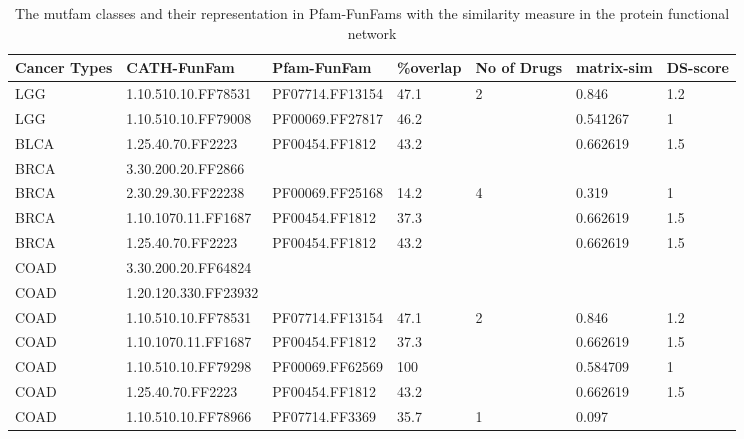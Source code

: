 \documentclass[a4paper, 11pt]{article}
\begin{document}
\begin{table}[!htbp]
\fontsize{9}{10}\selectfont
\centering
\caption{The mutfam classes and their representation in Pfam-FunFams with the  similarity measure in the protein functional network}
\label{mutfam-table}
\begin{tabular}{|l|l|l|l|l|l|l|}
\hline
Cancer Types & CATH-FunFam          & Pfam-FunFam     & \%overlap & No of Drugs & matrix-sim & DS-score \\ \hline
LGG          & 1.10.510.10.FF78531  & PF07714.FF13154 & 47.1      & 2           & 0.846             & 1.2      \\ \hline
LGG          & 1.10.510.10.FF79008  & PF00069.FF27817 & 46.2      &             & 0.541267          & 1        \\ \hline
BLCA         & 1.25.40.70.FF2223    & PF00454.FF1812  & 43.2      &             & 0.662619          & 1.5      \\ \hline
BRCA         & 3.30.200.20.FF2866   &                 &           &             &                   &          \\ \hline
BRCA         & 2.30.29.30.FF22238   & PF00069.FF25168 & 14.2      & 4           & 0.319             & 1        \\ \hline
BRCA         & 1.10.1070.11.FF1687  & PF00454.FF1812  & 37.3      &             & 0.662619          & 1.5      \\ \hline
BRCA         & 1.25.40.70.FF2223    & PF00454.FF1812  & 43.2      &             & 0.662619          & 1.5      \\ \hline
COAD         & 3.30.200.20.FF64824  &                 &           &             &                   &          \\ \hline
COAD         & 1.20.120.330.FF23932 &                 &           &             &                   &          \\ \hline
COAD         & 1.10.510.10.FF78531  & PF07714.FF13154 & 47.1      & 2           & 0.846             & 1.2      \\ \hline
COAD         & 1.10.1070.11.FF1687  & PF00454.FF1812  & 37.3      &             & 0.662619          & 1.5      \\ \hline
COAD         & 1.10.510.10.FF79298  & PF00069.FF62569 & 100       &             & 0.584709          & 1        \\ \hline
COAD         & 1.25.40.70.FF2223    & PF00454.FF1812  & 43.2      &             & 0.662619          & 1.5      \\ \hline
COAD         & 1.10.510.10.FF78966  & PF07714.FF3369  & 35.7      & 1           & 0.097             &          \\ \hline

\end{tabular}
\end{table}
\end{document}
